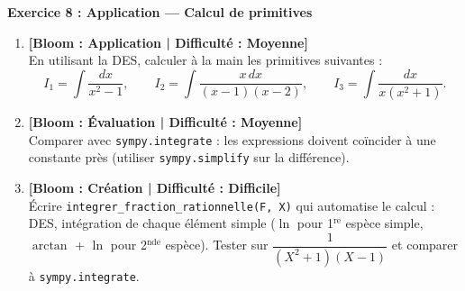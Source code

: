 \noindent\textbf{Exercice 8 : Application --- Calcul de primitives}
\begin{enumerate}
    \item \textbf{[Bloom : Application | Difficulté : Moyenne]} \\
    En utilisant la DES, calculer à la main les primitives suivantes :
    \[ I_1 = \int \frac{dx}{x^2 - 1}, \qquad I_2 = \int \frac{x\, dx}{(x - 1)(x - 2)}, \qquad I_3 = \int \frac{dx}{x(x^2 + 1)}. \]
    \item \textbf{[Bloom : Évaluation | Difficulté : Moyenne]} \\
    Comparer avec \texttt{sympy.integrate} : les expressions doivent coïncider à une constante près (utiliser \texttt{sympy.simplify} sur la différence).
    \item \textbf{[Bloom : Création | Difficulté : Difficile]} \\
    Écrire \texttt{integrer\_fraction\_rationnelle(F, X)} qui automatise le calcul : DES, intégration de chaque élément simple ($\ln$ pour 1$^{\text{re}}$ espèce simple, $\arctan$ + $\ln$ pour 2$^{\text{nde}}$ espèce). Tester sur $\dfrac{1}{(X^2 + 1)(X - 1)}$ et comparer à \texttt{sympy.integrate}.
\end{enumerate}

